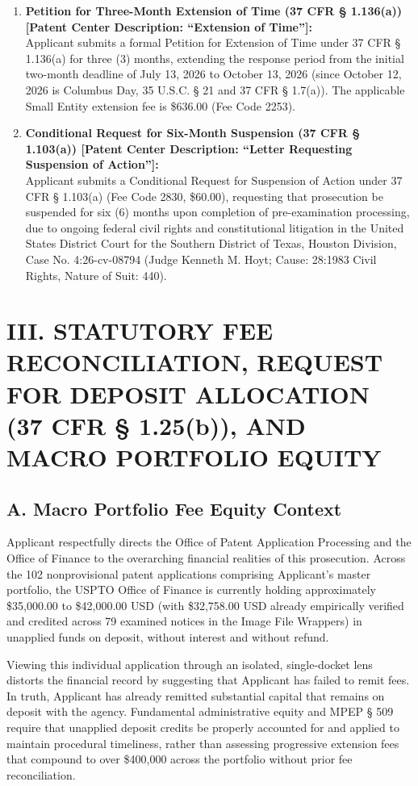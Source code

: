 \documentclass[11pt,letterpaper]{article}
\begin{document}
\begin{enumerate}[leftmargin=*]
    \item \textbf{Petition for Three-Month Extension of Time (37 CFR \S{} 1.136(a)) [Patent Center Description: ``Extension of Time'']:} \\
    Applicant submits a formal Petition for Extension of Time under 37 CFR \S{} 1.136(a) for three (3) months, extending the response period from the initial two-month deadline of July 13, 2026 to October 13, 2026 (since October 12, 2026 is Columbus Day, 35 U.S.C. \S{} 21 and 37 CFR \S{} 1.7(a)). The applicable Small Entity extension fee is \$636.00 (Fee Code 2253).

    \item \textbf{Conditional Request for Six-Month Suspension (37 CFR \S{} 1.103(a)) [Patent Center Description: ``Letter Requesting Suspension of Action'']:} \\
    Applicant submits a Conditional Request for Suspension of Action under 37 CFR \S{} 1.103(a) (Fee Code 2830, \$60.00), requesting that prosecution be suspended for six (6) months upon completion of pre-examination processing, due to ongoing federal civil rights and constitutional litigation in the United States District Court for the Southern District of Texas, Houston Division, Case No. 4:26-cv-08794 (Judge Kenneth M. Hoyt; Cause: 28:1983 Civil Rights, Nature of Suit: 440).
\end{enumerate}

\section*{III. STATUTORY FEE RECONCILIATION, REQUEST FOR DEPOSIT ALLOCATION (37 CFR \S{} 1.25(b)), AND MACRO PORTFOLIO EQUITY}

\subsection*{A. Macro Portfolio Fee Equity Context}
Applicant respectfully directs the Office of Patent Application Processing and the Office of Finance to the overarching financial realities of this prosecution. Across the 102 nonprovisional patent applications comprising Applicant's master portfolio, the USPTO Office of Finance is currently holding approximately \$35,000.00 to \$42,000.00 USD (with \$32,758.00 USD already empirically verified and credited across 79 examined notices in the Image File Wrappers) in unapplied funds on deposit, without interest and without refund. 

Viewing this individual application through an isolated, single-docket lens distorts the financial record by suggesting that Applicant has failed to remit fees. In truth, Applicant has already remitted substantial capital that remains on deposit with the agency. Fundamental administrative equity and MPEP \S{} 509 require that unapplied deposit credits be properly accounted for and applied to maintain procedural timeliness, rather than assessing progressive extension fees that compound to over \$400,000 across the portfolio without prior fee reconciliation.
\end{document}
